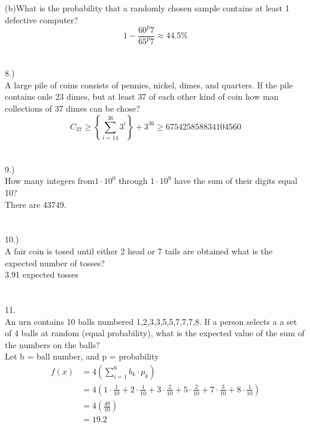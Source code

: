 \documentclass[fleqn]{article}
\begin{document}
(b)What is the probability that a randomly chosen sample contains at least 1 
defective  computer?
\begin{equation*}  
  1-\frac{60^p7}{65^p7} \approx 44.5\%
\end{equation*}
 
\section*{}
8.)\\
A large pile of coins consists of pennies, nickel, dimes, and quarters. If the pile
contains onle 23 dimes, but at least 37 of each other kind of coin how man collections
of 37 dimes can be chose?
\begin{equation*}
  C_{37} \geq \left\{ \sum_{i=14}^{36}3^i \right\} + 3^{36} \geq 675425858834104560
\end{equation*}

\section*{}
9.)\\
How many integers from$ 1 \cdot 10^0$ through $ 1 \cdot 10^9$ have the sum of their digits
equal 10?\\
There are 43749.

\section*{}
10.)\\
A fair coin is tosed until either 2 head or 7 tails are obtained what is the expected 
number of tosses?
\\
3.91 expected tosses

\section*{}
11.\\
An urn contains 10 balls numbered 1,2,3,3,5,5,7,7,7,8. If a person selects a a set of
4 balls at random (equal probability), what is the expected value of the
sum of the numbers on the balls?\\
Let b = ball number, and p = probability \\

\begin{equation*}
  \begin{aligned}
    f\left(x  \right)&=  4 \left( \sum_{i=1}^{6}b_k \cdot p_k \right)\\ 
    &= 4\left(  1 \cdot \frac{1}{10}+2\cdot\frac{1}{10} + 3  
    \cdot \frac{2}{10} + 5 \cdot \frac{2}{10}+7\cdot\frac{3}{10}+8\cdot\frac{1}{10}\right)\\ 
    &= 4 \left( \frac{48}{10} \right)\\
    & =19.2
  \end{aligned}
\end{equation*}
\end{document}
